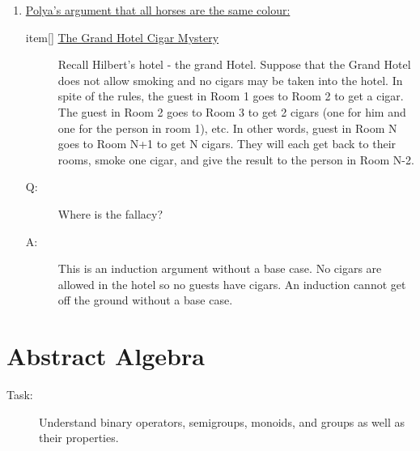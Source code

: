\documentclass[10pt]{article}
\begin{document}
\begin{description}
\begin{enumerate}
			\item[] \underline{Polya's argument that all horses are the same colour:}
			item[] \underline{The Grand Hotel Cigar Mystery}
			\begin{description}
				\item[] Recall Hilbert's hotel - the grand Hotel. Suppose that the Grand Hotel does not allow smoking and no cigars may be taken into the hotel. In spite of the rules, the guest in Room 1 goes to Room 2 to get a cigar. The guest in Room 2 goes to Room 3 to get 2 cigars (one for him and one for the person in room 1), etc. In other words, guest in Room N goes to Room N+1 to get N cigars. They will each get back to their rooms, smoke one cigar, and give the result to the person in Room N-2.
				\item[Q:] Where is the fallacy?
				\item[A:] This is an induction argument without a base case. No cigars are allowed in the hotel so no guests have cigars. An induction cannot get off the ground without a base case.
			\end{description}
		\end{enumerate}
	\end{description}
	
	\section{Abstract Algebra}
	\begin{description}
		\item[Task:] Understand binary operators, semigroups, monoids, and groups as well as their properties.
	\end{description}
	
\end{document}
